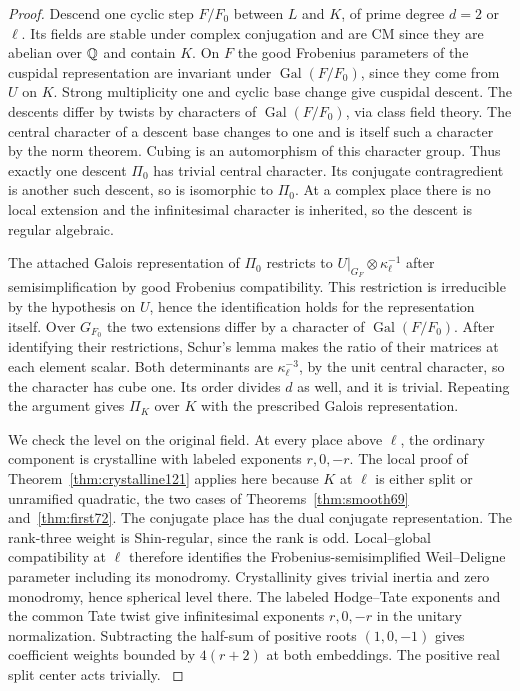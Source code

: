\documentclass[a4paper,11pt]{article}
\theoremstyle{definition}
\theoremstyle{remark}
\numberwithin{equation}{section}
\begin{document}
\begin{proof}
Descend one cyclic step \(F/F_0\) between \(L\) and \(K\), of
prime degree \(d=2\) or \(\ell\). Its fields are stable under
complex conjugation and are CM since they are abelian over
\(\mathbb Q\) and contain \(K\). On \(F\) the good Frobenius parameters
of the cuspidal representation are invariant under
\(\operatorname{Gal}(F/F_0)\), since they come from \(U\) on
\(K\). Strong multiplicity one and cyclic base change give
cuspidal descent. The descents differ by twists by characters
of \(\operatorname{Gal}(F/F_0)\), via class field theory.
The central character of a descent base changes to one and is
itself such a character by the norm theorem. Cubing is an
automorphism of this character group. Thus exactly one descent
\(\Pi_0\) has trivial central character. Its conjugate
contragredient is another such descent, so is isomorphic to
\(\Pi_0\). At a complex place there is no local extension and
the infinitesimal character is inherited, so the descent is regular algebraic.~\cite{VII-V-I-ac123,VII-V-clozelrajan358}

The attached Galois representation of \(\Pi_0\) restricts to
\(U|_{G_F}\otimes\kappa_\ell^{-1}\) after semisimplification
by good Frobenius compatibility. This restriction is irreducible
by the hypothesis on \(U\), hence the identification holds for
the representation itself. Over \(G_{F_0}\) the two extensions
differ by a character of \(\operatorname{Gal}(F/F_0)\). After
identifying their restrictions, Schur's lemma makes the ratio
of their matrices at each element scalar. Both determinants are
\(\kappa_\ell^{-3}\), by the unit central character, so the
character has cube one. Its order divides \(d\) as well, and
it is trivial. Repeating the argument gives \(\Pi_K\) over \(K\)
with the prescribed Galois representation.~\cite{VII-V-V-shin}

We check the level on the original field. At every place above
\(\ell\), the ordinary component is crystalline with labeled
exponents \(r,0,-r\). The local proof of
Theorem~\ref{thm:crystalline121} applies here because \(K\)
at \(\ell\) is either split or unramified quadratic, the two
cases of Theorems~\ref{thm:smooth69} and~\ref{thm:first72}.
The conjugate place has the dual conjugate representation.
The rank-three weight is Shin-regular, since the rank is odd.
Local--global compatibility at \(\ell\) therefore identifies
the Frobenius-semisimplified Weil--Deligne parameter including
its monodromy. Crystallinity gives trivial inertia and zero
monodromy, hence spherical level there. The labeled
Hodge--Tate exponents and the common Tate twist give
infinitesimal exponents \(r,0,-r\) in the unitary normalization.
Subtracting the half-sum of positive roots \((1,0,-1)\)
gives coefficient weights bounded by \(4(r+2)\) at both
embeddings. The positive real split center acts trivially.
\cite{VII-V-lgp361,VII-V-V-shin}


\end{proof}
\end{document}
